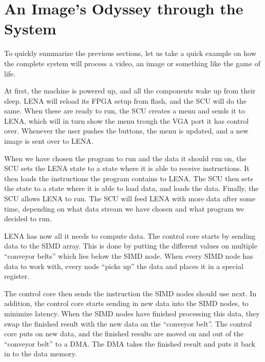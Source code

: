 \section{An Image's Odyssey through the System}

To quickly summarize the previous sections, let us take a quick example on how
the complete system will process a video, an image or something like the game of
life.

At first, the machine is powered up, and all the components wake up from their
sleep. \ac{LENA} will reload its \ac{FPGA} setup from flash, and the \ac{SCU}
will do the same. When these are ready to run, the \ac{SCU} creates a menu and
sends it to \ac{LENA}, which will in turn show the menu trough the \ac{VGA} port
it has control over. Whenever the user pushes the buttons, the menu is updated,
and a new image is sent over to \ac{LENA}.

When we have chosen the program to run and the data it should run on, the
\ac{SCU} sets the \ac{LENA} state to a state where it is able to receive
instructions. It then loads the instructions the program contains to
\ac{LENA}. The \ac{SCU} then sets the state to a state where it is able to load
data, and loads the data. Finally, the \ac{SCU} allows \ac{LENA} to run. The
  \ac{SCU} will feed \ac{LENA} with more data after some time, depending on what
  data stream we have chosen and what program we decided to run.

\ac{LENA} has now all it needs to compute data.  The control core starts by sending data to the
\ac{SIMD} array. This is done by putting the different values on multiple
``conveyor belts'' which lies below the \ac{SIMD} node.  When every
\ac{SIMD} node has data to work with, every node ``picks up'' the data and
places it in a special register.

The control core then sends the instruction the \ac{SIMD} nodes should use
next. In addition, the control core starts sending in new data into the
\ac{SIMD} nodes, to minimize latency. When the \ac{SIMD} nodes have finished
processing this data, they swap the finished result with the new data on the
``conveyor belt''. The control core puts on new data, and the finished results
are moved on and out of the ``conveyor belt'' to a \ac{DMA}. The \ac{DMA} takes
the finished result and puts it back in to the data memory. 

